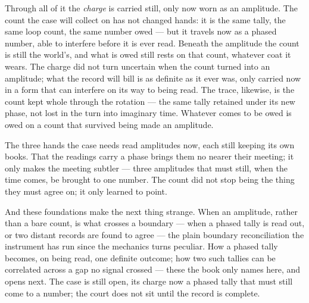 Through all of it the \emph{charge} is carried still, only now worn as an amplitude. The count the case will
collect on has not changed hands: it is the same tally, the same loop count, the same number owed --- but it
travels now as a phased number, able to interfere before it is ever read. Beneath the amplitude the count is
still the world's, and what is owed still rests on that count, whatever coat it wears. The charge did not turn
uncertain when the count turned into an amplitude; what the record will bill is as definite as it ever was, only
carried now in a form that can interfere on its way to being read. The trace, likewise, is
the count kept whole through the rotation --- the same tally retained under its new phase, not lost in the turn
into imaginary time. Whatever comes to be owed is owed on a count that survived being made an amplitude.

The three hands the case needs read amplitudes now, each still keeping its own books. That the readings carry a
phase brings them no nearer their meeting; it only makes the meeting subtler --- three amplitudes that must
still, when the time comes, be brought to one number. The count did not stop being the thing they must agree
on; it only learned to point.

And these foundations make the next thing strange. When an amplitude, rather than a bare count, is what crosses
a boundary --- when a phased tally is read out, or two distant records are found to agree --- the plain boundary
reconciliation the instrument has run since the mechanics turns peculiar. How a phased tally becomes, on being
read, one definite outcome; how two such tallies can be correlated across a gap no signal crossed --- these the
book only names here, and opens next. The case is still open, its charge now a phased tally that must still come
to a number; the court does not sit until the record is complete.


